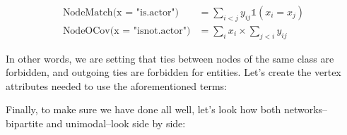 \documentclass[]{book}
\newenvironment{Shaded}{\begin{snugshade}}{\end{snugshade}}
\newcommand{\CommentTok}[1]{\textcolor[rgb]{0.56,0.35,0.01}{\textit{#1}}}
\newcommand{\DataTypeTok}[1]{\textcolor[rgb]{0.13,0.29,0.53}{#1}}
\newcommand{\DecValTok}[1]{\textcolor[rgb]{0.00,0.00,0.81}{#1}}
\newcommand{\KeywordTok}[1]{\textcolor[rgb]{0.13,0.29,0.53}{\textbf{#1}}}
\newcommand{\NormalTok}[1]{#1}
\newcommand{\OperatorTok}[1]{\textcolor[rgb]{0.81,0.36,0.00}{\textbf{#1}}}
\newcommand{\StringTok}[1]{\textcolor[rgb]{0.31,0.60,0.02}{#1}}
\begin{document}
\begin{align*}
\text{NodeMatch(x = "is.actor")} &= \sum_{i<j} y_{ij}\mathbb{1}\left(x_i = x_j\right) \\
\text{NodeOCov(x = "isnot.actor")} &= \sum_{i} x_i \times \sum_{j<i} y_{ij} 
\end{align*}

In other words, we are setting that ties between nodes of the same class are
forbidden, and outgoing ties are forbidden for entities. Let's create the
vertex attributes needed to use the aforementioned terms:

\begin{Shaded}
\end{Shaded}

Finally, to make sure we have done all well, let's look how both networks--bipartite
and unimodal--look side by side:

\begin{Shaded}
\end{Shaded}
\end{document}
